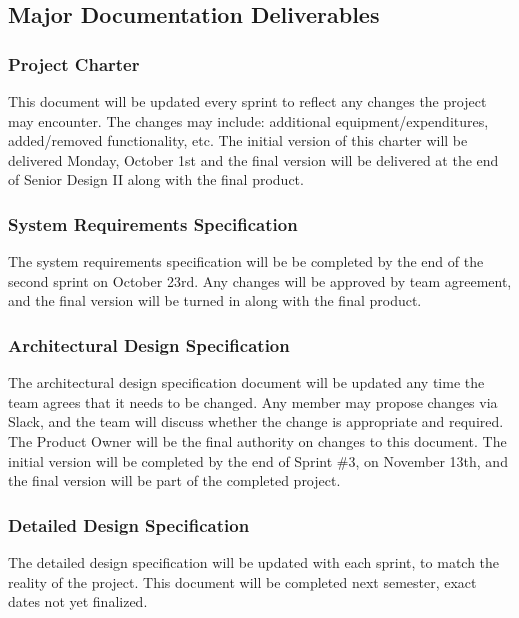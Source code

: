 
\subsection{Major Documentation Deliverables}

\subsubsection{Project Charter}
This document will be updated every sprint to reflect any changes the project may encounter. The changes may include: additional equipment/expenditures, added/removed functionality, etc. The initial version of this charter will be delivered Monday, October 1st and the final version will be delivered at the end of Senior Design II along with the final product.

\subsubsection{System Requirements Specification}
The system requirements specification will be be completed by the end of the second sprint on October 23rd. Any changes will be approved by team agreement, and the final version will be turned in along with the final product.

\subsubsection{Architectural Design Specification}
The architectural design specification document will be updated any time the team agrees that it needs to be changed. Any member may propose changes via Slack, and the team will discuss whether the change is appropriate and required. The Product Owner will be the final authority on changes to this document. The initial version will be completed by the end of Sprint \#3, on November 13th, and the final version will be part of the completed project.

\subsubsection{Detailed Design Specification}
The detailed design specification will be updated with each sprint, to match the reality of the project. This document will be completed next semester, exact dates not yet finalized.

